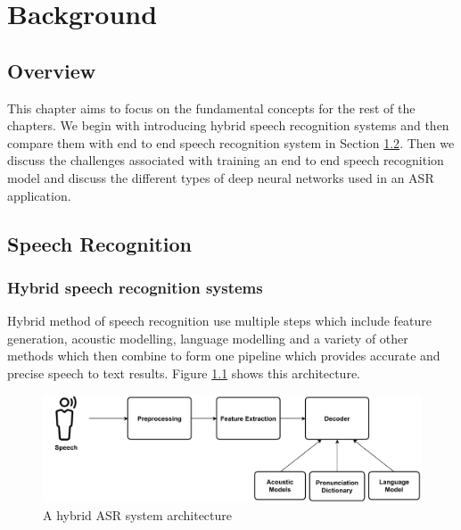 \chapter{Background}
\label{chapter:background} 

\section{Overview}
This chapter aims to focus on the fundamental concepts for the rest of the chapters. We begin with introducing hybrid speech recognition systems and then compare them with end to end speech recognition system in Section \ref{section:asr}. Then we discuss the challenges associated with training an end to end speech recognition model and discuss the different types of deep neural networks used in an ASR application.

\section{Speech Recognition}
\label{section:asr}

\subsection{Hybrid speech recognition systems}
\label{section:hybridasr}
Hybrid method of speech recognition use multiple steps which include feature generation, acoustic modelling, language modelling and a variety of other methods which then combine to form one pipeline which provides accurate and precise speech to text results. Figure \ref{fig:hyrid_asr_model} shows this architecture.

\begin{figure}[ht]
  \begin{center}
    \includegraphics[width=\textwidth]{images/Hybrid ASR System.pdf} 
    \caption{A hybrid ASR system architecture}
    \label{fig:hyrid_asr_model}
  \end{center}
\end{figure}

